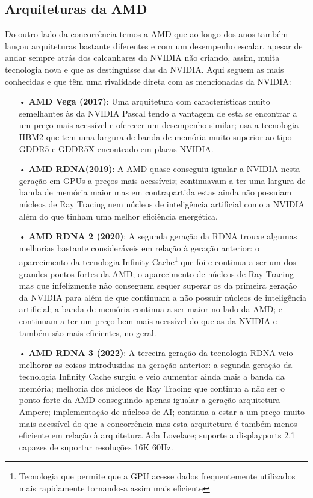 \documentclass[a4paper,11pt,]{report}
\begin{document}
\subsection{Arquiteturas da AMD}
Do outro lado da concorrência temos a AMD que ao longo dos anos também lançou arquiteturas bastante diferentes e com um desempenho escalar, apesar de andar sempre atrás dos calcanhares da NVIDIA não criando, assim, muita tecnologia nova e que as destinguisse das da NVIDIA. Aqui seguem as mais conhecidas e que têm uma rivalidade direta com as mencionadas da NVIDIA:
\begin{itemize}
 \item[•] \textbf{AMD Vega (2017)}: Uma arquitetura com características muito semelhantes às da NVIDIA Pascal tendo a vantagem de esta se encontrar a um preço mais acessível e oferecer um desempenho similar; usa a tecnologia HBM2 que tem uma largura de banda de memória muito superior ao tipo GDDR5 e GDDR5X encontrado em placas NVIDIA.
  \item[•] \textbf{AMD RDNA(2019)}: A AMD quase conseguiu igualar a NVIDIA nesta geração em GPUs a preços mais acessíveis; continuavam a ter uma largura de banda de memória maior mas em contrapartida estas ainda não possuiam núcleos de Ray Tracing nem núcleos de inteligência artificial como a NVIDIA além do que tinham uma melhor eficiência energética.
  \item[•] \textbf{AMD RDNA 2 (2020)}: A segunda geração da RDNA trouxe algumas melhorias bastante consideráveis em relação à geração anterior: o aparecimento da tecnologia Infinity Cache\footnote{Tecnologia que permite que a GPU acesse dados frequentemente utilizados mais rapidamente tornando-a assim mais eficiente} que foi e continua a ser um dos grandes pontos fortes da AMD; o aparecimento de núcleos de Ray Tracing mas que infelizmente não conseguem sequer superar os da primeira geração da NVIDIA para além de que continuam a não possuir núcleos de inteligência artificial; a banda de memória continua a ser maior no lado da AMD; e continuam a ter um preço bem mais acessível do que as da NVIDIA e também são mais eficientes, no geral.
 \item[•] \textbf{AMD RDNA 3 (2022)}: A terceira geração da tecnologia RDNA veio melhorar as coisas introduzidas na geração anterior: a segunda geração da tecnologia Infinity Cache surgiu e veio aumentar ainda mais a banda da memória; melhoria dos núcleos de Ray Tracing que continua a não ser o ponto forte da AMD conseguindo apenas igualar a geração arquitetura Ampere; implementação de núcleos de AI; continua a estar a um preço muito mais acessível do que a concorrência mas esta arquitetura é também menos eficiente em relação à arquitetura Ada Lovelace; suporte a displayports 2.1 capazes de suportar resoluções 16K 60Hz.
\end{itemize}
\end{document}
